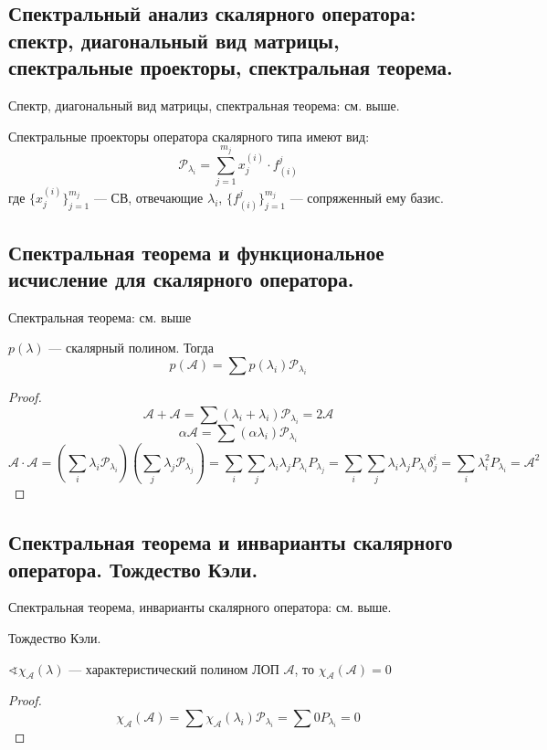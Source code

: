 \subsection{Спектральный анализ скалярного оператора: спектр, диагональный вид матрицы, спектральные проекторы, спектральная теорема.}

Спектр, диагональный вид матрицы, спектральная теорема: см. выше.

\begin{lemma}
    Спектральные проекторы оператора скалярного типа имеют вид:
    $$\mathcal P_{\lambda_i} = \sum_{j=1}^{m_j} x_j^{(i)} \cdot f^j_{(i)}$$
    где $\{x_j^{(i)}\}_{j=1}^{m_j}$ --- СВ, отвечающие $\lambda_i$, $\{f^j_{(i)}\}_{j=1}^{m_j}$ --- сопряженный ему базис.
\end{lemma}

\subsection{Спектральная теорема и функциональное исчисление для скалярного оператора.}
Спектральная теорема: см. выше

$p(\lambda)$ --- скалярный полином. Тогда
$$p(\mathcal A) = \sum p(\lambda_i) \mathcal P_{\lambda_i}$$
\begin{proof}
    $$\mathcal A + \mathcal A = \sum (\lambda_i + \lambda_i) \mathcal P_{\lambda_i} = 2\mathcal A$$
    $$\alpha \mathcal A = \sum (\alpha \lambda_i) \mathcal P_{\lambda_i}$$
    $$\mathcal A \cdot \mathcal A = \left(\sum_i \lambda_i \mathcal P_{\lambda_i} \right) \left(\sum_j \lambda_j \mathcal P_{\lambda_j} \right) = \sum_i \sum_j \lambda_i \lambda_j P_{\lambda_i} P_{\lambda_j} = \sum_i \sum_j \lambda_i \lambda_j P_{\lambda_i} \delta^i_j = \sum_i \lambda^2_i P_{\lambda_i} = \mathcal A^2$$
\end{proof}

\subsection{Спектральная теорема и инварианты скалярного оператора. Тождество Кэли.}
Спектральная теорема, инварианты скалярного оператора: см. выше.
\begin{lemma}
    Тождество Кэли.

    $\sphericalangle \chi_{\mathcal A}(\lambda)$ --- характеристический полином ЛОП $\mathcal A$, то $\chi_{\mathcal A}(\mathcal A)=0$
\end{lemma}
\begin{proof}
    $$\chi_{\mathcal A}(\mathcal A) = \sum \chi_{\mathcal A}(\lambda_i) \mathcal P_{\lambda_i} = \sum 0 P_{\lambda_i} = 0$$
\end{proof}

